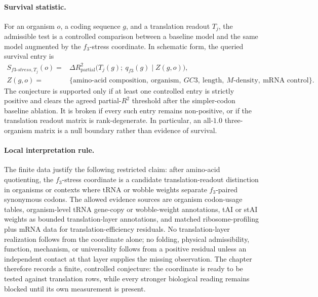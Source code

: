 \paragraph{Survival statistic.}
For an organism $o$, a coding sequence $g$, and a translation readout $T_j$, the admissible test is a controlled comparison between a baseline model and the same model augmented by the $f_3$-stress coordinate.  In schematic form, the queried survival entry is
$$
\begin{aligned}
S_{f3\text{-}stress,T_j}(o)
  ={}& \Delta R^2_{\mathrm{partial}}\bigl(T_j(g);\ q_{f3}(g)\mid Z(g,o)\bigr),\\
Z(g,o) ={}& \{\text{amino-acid composition},\ \text{organism},\ GC3,\ \text{length},\ M\text{-density},\ \text{mRNA control}\}.
\end{aligned}
$$
The conjecture is supported only if at least one controlled entry is strictly positive and clears the agreed partial-$R^2$ threshold after the simpler-codon baseline ablation.  It is broken if every such entry remains non-positive, or if the translation readout matrix is rank-degenerate.  In particular, an all-$1.0$ three-organism matrix is a null boundary rather than evidence of survival.

\paragraph{Local interpretation rule.}
The finite data justify the following restricted claim: after amino-acid quotienting, the $f_3$-stress coordinate is a candidate translation-readout distinction in organisms or contexts where tRNA or wobble weights separate $f_3$-paired synonymous codons.  The allowed evidence sources are organism codon-usage tables, organism-level tRNA gene-copy or wobble-weight annotations, tAI or stAI weights as bounded translation-layer annotations, and matched ribosome-profiling plus mRNA data for translation-efficiency residuals.  No translation-layer realization follows from the coordinate alone; no folding, physical admissibility, function, mechanism, or universality follows from a positive residual unless an independent contact at that layer supplies the missing observation.  The chapter therefore records a finite, controlled conjecture: the coordinate is ready to be tested against translation rows, while every stronger biological reading remains blocked until its own measurement is present.
